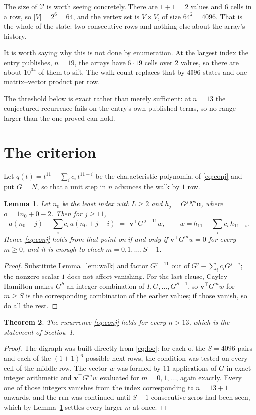 \documentclass[11pt,a4paper]{article}
\theoremstyle{plain}
\newtheorem{theorem}{Theorem}
\newtheorem{lemma}[theorem]{Lemma}
\theoremstyle{definition}
\begin{document}
The size of $\mathcal V$ is worth seeing concretely. There are $1+1=2$ values
and $6$ cells in a row, so $|V|=2^{6}=64$, and the vertex set is
$V\times V$, of size $64^2=4096$. That is the whole of the state: two consecutive
rows and nothing else about the array's history.

It is worth saying why this is not done by enumeration. At the largest index the entry
publishes, $n=19$, the arrays have $6\cdot19$ cells over
$2$ values, so there are about $10^{34}$ of them to sift. The
walk count replaces that by $4096$ states and one matrix--vector product per row.

The threshold below is exact rather than merely sufficient: at $n=13$ the conjectured
recurrence fails on the entry's own published terms, so no range larger than the one proved
can hold.
\section{The criterion}

Let $q(t)=t^{11}-\sum_i c_i\,t^{11-i}$ be the characteristic polynomial of
\eqref{eq:conj} and put $G=N$, so that a unit step in $n$ advances the walk by
$1$ row.

\begin{lemma}\label{lem:crit}
Let $n_0$ be the least index with $L\ge2$ and $h_j=G^{j}N^{o}\mathbf{u}$, where
$o=1n_0+0-2$. Then for $j\ge11$,
\[
a(n_0+j)-\sum_i c_i\,a(n_0+j-i)\;=\;\,\mathbf{v}^{\!\top}G^{\,j-11}w,
\qquad w=h_{11}-\sum_i c_i\,h_{11-i} .
\]
Hence \eqref{eq:conj} holds from that point on if and only if
$\mathbf{v}^{\!\top}G^{m}w=0$ for every $m\ge0$, and it is enough to check
$m=0,1,\dots,S-1$.
\end{lemma}

\begin{proof}
Substitute Lemma~\ref{lem:walk} and factor $G^{j-11}$ out of
$G^{j}-\sum_ic_iG^{j-i}$; the nonzero scalar $1$ does not affect
vanishing. For the last clause, Cayley--Hamilton makes $G^{S}$ an integer combination of
$I,G,\dots,G^{S-1}$, so $\mathbf{v}^{\!\top}G^{m}w$ for $m\ge S$ is the corresponding
combination of the earlier values; if those vanish, so do all the rest.
\end{proof}

\begin{theorem}
The recurrence \eqref{eq:conj} holds for every $n>13$, which is the statement of
Section~1.
\end{theorem}

\begin{proof}
The digraph was built directly from \eqref{eq:loc}: for each of the $S=4096$ pairs and each
of the $(1+1)^{6}$ possible next rows, the condition was tested on every cell of
the middle row. The vector $w$ was formed by $11$ applications of $G$ in exact integer
arithmetic and $\mathbf{v}^{\!\top}G^{m}w$ evaluated for $m=0,1,\dots$, again exactly.
Every one of those integers vanishes from the index corresponding to $n=13+1$ onwards,
and the run was continued until $S+1$ consecutive zeros had been seen, which by
Lemma~\ref{lem:crit} settles every larger $m$ at once.
\end{proof}
\end{document}
